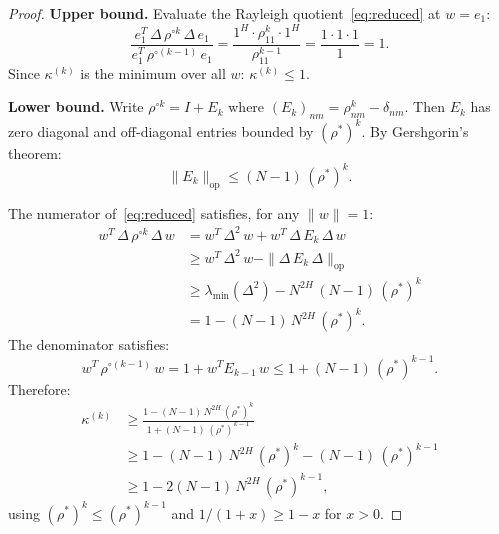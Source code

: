 \documentclass[11pt,a4paper]{article}
\theoremstyle{plain}
\theoremstyle{definition}
\theoremstyle{remark}
\begin{document}
\begin{proof}
\textbf{Upper bound.}
Evaluate the Rayleigh quotient~\eqref{eq:reduced}
at $w = e_1$:
\[
  \frac{e_1^T\,\Delta\,\rho^{\circ k}\,\Delta\,e_1}
       {e_1^T\,\rho^{\circ(k-1)}\,e_1}
  = \frac{1^H \cdot \rho_{11}^k \cdot 1^H}
         {\rho_{11}^{k-1}}
  = \frac{1 \cdot 1 \cdot 1}{1} = 1.
\]
Since $\kappa^{(k)}$ is the minimum over all $w$:
$\kappa^{(k)} \leq 1$.

\textbf{Lower bound.}
Write $\rho^{\circ k} = I + E_k$ where
$(E_k)_{nm} = \rho_{nm}^k - \delta_{nm}$.
Then $E_k$ has zero diagonal and off-diagonal entries
bounded by $(\rho^*)^k$.  By Gershgorin's theorem:
\begin{equation}\label{eq:Ek-bound}
  \|E_k\|_{\mathrm{op}} \leq (N{-}1)\,(\rho^*)^k.
\end{equation}

The numerator of~\eqref{eq:reduced} satisfies, for any
$\|w\| = 1$:
\begin{align*}
  w^T\,\Delta\,\rho^{\circ k}\,\Delta\,w
  &= w^T\,\Delta^2\,w
    + w^T\,\Delta\,E_k\,\Delta\,w \\
  &\geq w^T\,\Delta^2\,w
    - \|\Delta\,E_k\,\Delta\|_{\mathrm{op}} \\
  &\geq \lambda_{\min}(\Delta^2)
    - N^{2H}\,(N{-}1)\,(\rho^*)^k \\
  &= 1 - (N{-}1)\,N^{2H}\,(\rho^*)^k.
\end{align*}
The denominator satisfies:
\[
  w^T\,\rho^{\circ(k-1)}\,w
  = 1 + w^T E_{k-1}\,w
  \leq 1 + (N{-}1)\,(\rho^*)^{k-1}.
\]
Therefore:
\begin{align*}
  \kappa^{(k)}
  &\geq \frac{1 - (N{-}1)\,N^{2H}\,(\rho^*)^k}
              {1 + (N{-}1)\,(\rho^*)^{k-1}} \\
  &\geq 1 - (N{-}1)\,N^{2H}\,(\rho^*)^k
    - (N{-}1)\,(\rho^*)^{k-1} \\
  &\geq 1 - 2(N{-}1)\,N^{2H}\,(\rho^*)^{k-1},
\end{align*}
using $(\rho^*)^k \leq (\rho^*)^{k-1}$ and
$1/(1+x) \geq 1-x$ for $x > 0$.
\end{proof}
\end{document}
